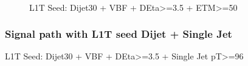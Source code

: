 \begin{figure}[!htp]%
\qquad
{}\\
\caption[HLT Seed L1TETM70]{L1T Seed: Dijet30 + VBF + DEta>=3.5 + ETM>=50}
\label{FIGURE:RunIIPreparation_HLT_Seed_L1TETM70}
\end{figure}


\subsubsection{Signal path with L1T seed Dijet + Single Jet}

L1T Seed: Dijet30 + VBF + DEta>=3.5 + Single Jet pT>=96

